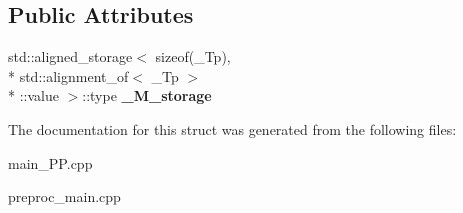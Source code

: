 \subsection*{Public Attributes}
\begin{DoxyCompactItemize}
\item 
\hypertarget{struct____gnu__cxx_1_1____aligned__buffer_a06dedd4e2644cbe2f1b906547447f153}{std\+::aligned\+\_\+storage$<$ sizeof(\+\_\+\+Tp), \\*
std\+::alignment\+\_\+of$<$ \+\_\+\+Tp $>$\\*
\+::value $>$\+::type {\bfseries \+\_\+\+M\+\_\+storage}}\label{struct____gnu__cxx_1_1____aligned__buffer_a06dedd4e2644cbe2f1b906547447f153}

\end{DoxyCompactItemize}


The documentation for this struct was generated from the following files\+:\begin{DoxyCompactItemize}
\item 
main\+\_\+\+P\+P.\+cpp\item 
preproc\+\_\+main.\+cpp\end{DoxyCompactItemize}
